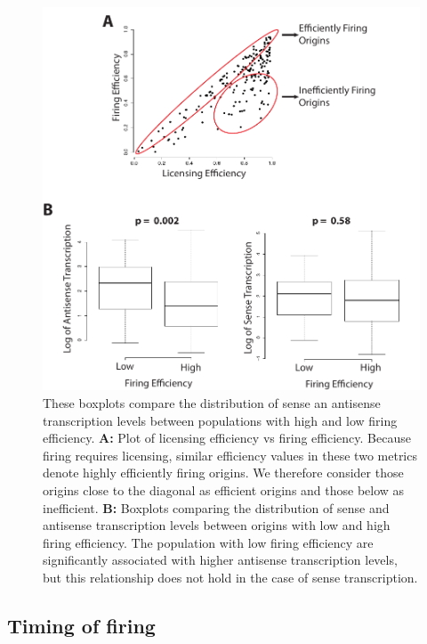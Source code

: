 \begin{figure}[h!]

\centering
\includegraphics[width=\textwidth]{figures/results/firing}
\caption[boxplots comparing transcription levels in high- and low-firing populations]{These boxplots compare the distribution of sense an antisense transcription levels between populations with high and low firing efficiency. \textbf{A: }Plot of licensing efficiency vs firing efficiency. Because firing requires licensing, similar efficiency values in these two metrics denote highly efficiently firing origins. We therefore consider those origins close to the diagonal as efficient origins and those below as inefficient. \textbf{B: } Boxplots comparing the distribution of sense and antisense transcription levels between origins with low and high firing efficiency. The population with low firing efficiency are significantly associated with higher antisense transcription levels, but this relationship does not hold in the case of sense transcription. }
\label{fig:firing}

\end{figure} 

\subsection{Timing of firing}

